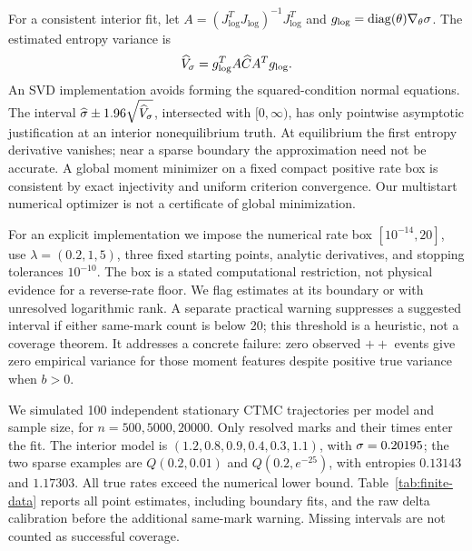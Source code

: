 For a consistent interior fit, let
$A=(J_{\log}^T J_{\log})^{-1}J_{\log}^T$ and
$g_{\log}=\operatorname{diag}(\theta)\nabla_\theta\sigma$. The estimated
entropy variance is
\begin{equation}
 \widehat V_\sigma=g_{\log}^T A\widehat C A^Tg_{\log}.
 \label{eq:entropy-delta}
\end{equation}
An SVD implementation avoids forming the squared-condition normal equations.
The interval $\widehat{\sigma}\pm1.96\sqrt{\widehat V_\sigma}$, intersected with
$[0,\infty)$, has only pointwise asymptotic justification at an interior
nonequilibrium truth. At equilibrium the first entropy derivative vanishes;
near a sparse boundary the approximation need not be accurate. A global
moment minimizer on a fixed compact positive rate box is consistent by exact
injectivity and uniform criterion convergence. Our multistart numerical
optimizer is not a certificate of global minimization.

For an explicit implementation we impose the numerical rate box
$[10^{-14},20]$, use $\lambda=(0.2,1,5)$, three fixed starting points,
analytic derivatives, and stopping tolerances $10^{-10}$. The box is a stated
computational restriction, not physical evidence for a reverse-rate floor.
We flag estimates at its boundary or with unresolved logarithmic rank.
A separate practical warning suppresses a suggested interval if either
same-mark count is below 20; this threshold is a heuristic, not a coverage
theorem. It addresses a concrete failure: zero observed $++$ events give
zero empirical variance for those moment features despite positive true
variance when $b>0$.

We simulated 100 independent stationary CTMC trajectories per model and
sample size, for $n=500,5000,20000$. Only resolved marks and their times enter
the fit. The interior model is $(1.2,0.8,0.9,0.4,0.3,1.1)$, with
$\sigma=0.20195$; the two sparse examples are $Q(0.2,0.01)$ and
$Q(0.2,e^{-25})$, with entropies $0.13143$ and $1.17303$. All true rates
exceed the numerical lower bound. Table~\ref{tab:finite-data} reports all
point estimates, including boundary fits, and the raw delta calibration
before the additional same-mark warning. Missing intervals are not counted
as successful coverage.

